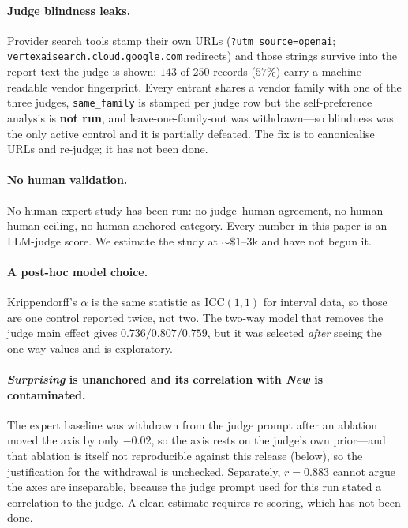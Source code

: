 \paragraph{Judge blindness leaks.} Provider search tools stamp their own URLs
(\texttt{?utm\_source=openai}; \texttt{vertexaisearch.cloud.google.com} redirects) and those strings
survive into the report text the judge is shown: $143$ of $250$ records ($57\%$) carry a
machine-readable vendor fingerprint. Every entrant shares a vendor family with one of the three
judges, \texttt{same\_family} is stamped per judge row but the self-preference analysis is
\textbf{not run}, and leave-one-family-out was withdrawn---so blindness was the only active control
and it is partially defeated. The fix is to canonicalise URLs and re-judge; it has not been done.

\paragraph{No human validation.} No human-expert study has been run: no judge--human agreement, no
human--human ceiling, no human-anchored category. Every number in this paper is an LLM-judge score.
We estimate the study at ${\sim}\$1$--$3$k and have not begun it.

\paragraph{A post-hoc model choice.} Krippendorff's $\alpha$ is the same statistic as
$\mathrm{ICC}(1,1)$ for interval data, so those are one control reported twice, not two. The
two-way model that removes the judge main effect gives $0.736/0.807/0.759$, but it was selected
\emph{after} seeing the one-way values and is exploratory.

\paragraph{\emph{Surprising} is unanchored and its correlation with \emph{New} is contaminated.} The
expert baseline was withdrawn from the judge prompt after an ablation moved the axis by only $-0.02$,
so the axis rests on the judge's own prior---and that ablation is itself not reproducible against this
release (below), so the justification for the withdrawal is unchecked. Separately, $r=0.883$ cannot argue the axes are inseparable,
because the judge prompt used for this run stated a correlation to the judge. A clean estimate
requires re-scoring, which has not been done.

